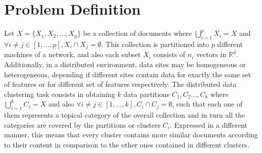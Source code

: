 \documentclass[10pt]{article}
\begin{document}
\section{Problem Definition}
Let $X=\{X_1,X_2,\ldots ,X_p\}$ be a collection of documents where \(\bigcup_{i=1}^p X_i=X\) and \(\forall i\neq j \in [1,\ldots ,p], X_i\cap X_j=\emptyset\). This collection is partitioned into $p$ different machines of a network, and also each subset $X_i$ consists of $n_i$ vectors in $\mathbb{R}^d$. Additionally, in a distributed environment, data sites may be homogeneous or heterogeneous, depending if different sites contain data for exactly the same set of features or for different set of features respectively.  
The distributed data clustering task consists in obtaining $k$ data partitions \(C_1,C_2\ldots,C_k\) where \(\bigcup_{i=1}^k C_i=X\) and also \(\forall i\neq j \in [1,\ldots ,k], C_i\cap C_j=\emptyset\), such that each one of them represents a topical category of the overall collection and in turn all the categories are covered by the partitions or clusters $C_i$. Expressed in a different manner, this means that every cluster contains more similar documents according to their content in comparison to the other ones contained in different clusters.
\end{document}
